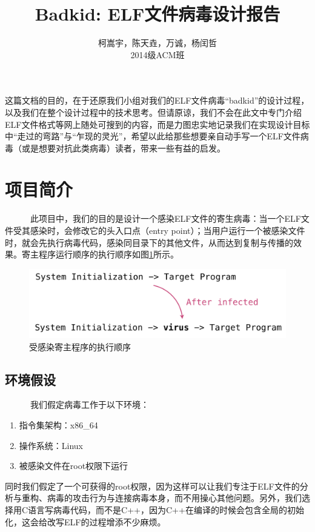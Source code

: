 \documentclass[a4paper, 11pt]{article}
\begin{document}
\title{Badkid: ELF文件病毒设计报告}

\author{柯嵩宇，陈天垚，万诚，杨闰哲\vspace{1em} \\ 2014级ACM班}
\maketitle

这篇文档的目的，在于还原我们小组对我们的ELF文件病毒“badkid”的设计过程，以及我们在整个设计过程中的技术思考。但请原谅，我们不会在此文中专门介绍ELF文件格式等网上随处可搜到的内容，而是力图忠实地记录我们在实现设计目标中“走过的弯路”与“乍现的灵光”，希望以此给那些想要亲自动手写一个ELF文件病毒（或是想要对抗此类病毒）读者，带来一些有益的启发。

\tableofcontents
\newpage
\section{项目简介}
	~~~~~~此项目中，我们的目的是设计一个感染ELF文件的寄生病毒：当一个ELF文件受其感染时，会修改它的头入口点（entry point）；当用户运行一个被感染文件时，就会先执行病毒代码，感染同目录下的其他文件，从而达到复制与传播的效果。寄主程序运行顺序的执行顺序如图\ref{fig:order}所示。
	\vspace{1em}
	\begin{figure}[htbp]
		\centering
		\includegraphics[width = \textwidth]{figures/fig3_first}
		\caption{受感染寄主程序的执行顺序}
		\label{fig:order}
	\end{figure}
\subsection{环境假设}	
	~~~~~~我们假定病毒工作于以下环境：
	\begin{enumerate}
		\item 指令集架构：x86\_64
		\item 操作系统：Linux
		\item 被感染文件在root权限下运行
	\end{enumerate}
	
	同时我们假定了一个可获得的root权限，因为这样可以让我们专注于ELF文件的分析与重构、病毒的攻击行为与连接病毒本身，而不用操心其他问题。另外，我们选择用C语言写病毒代码，而不是C++，因为C++在编译的时候会包含全局的初始化，这会给改写ELF的过程增添不少麻烦。
\end{document}
